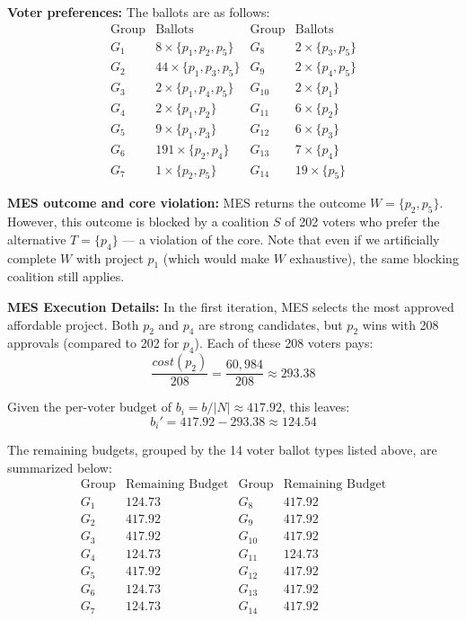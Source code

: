\documentclass[magisterska,en]{pracamgr}
\begin{document}
\textbf{Voter preferences:}
The ballots are as follows:
$$
\begin{array}{cl|cl}
    \text{Group} & \text{Ballots} & \text{Group} & \text{Ballots} \\
    \hline
    G_1 & 8\times\{p_1, p_2, p_5\} & G_8 & 2\times\{p_3, p_5\} \\
    G_2 & 44\times\{p_1, p_3, p_5\} & G_9 & 2\times\{p_4, p_5\} \\
    G_3 & 2\times\{p_1, p_4, p_5\} & G_{10} & 2\times\{p_1\} \\
    G_4 & 2\times\{p_1, p_2\} & G_{11} & 6\times\{p_2\} \\
    G_5 & 9\times\{p_1, p_3\} & G_{12} & 6\times\{p_3\} \\
    G_6 & 191\times\{p_2, p_4\} & G_{13} & 7\times\{p_4\} \\
    G_7 & 1\times\{p_2, p_5\} & G_{14} & 19\times\{p_5\}
\end{array}
$$

\textbf{MES outcome and core violation:}  
MES returns the outcome $W=\{p_2,p_5\}$. However, this outcome is blocked by a coalition $S$ of 202 voters who prefer the alternative $T=\{p_4\}$ --- a violation of the core. Note that even if we artificially complete $W$ with project $p_1$ (which would make $W$ exhaustive), the same blocking coalition still applies.

\textbf{MES Execution Details:}  
In the first iteration, MES selects the most approved affordable project. Both $p_2$ and $p_4$ are strong candidates, but $p_2$ wins with 208 approvals (compared to 202 for $p_4$). Each of these 208 voters pays:
$$
\frac{cost(p_2)}{208}=\frac{60{,}984}{208}\approx293.38
$$

Given the per-voter budget of $b_i=b/|N|\approx417.92$, this leaves:
$$
b_i'=417.92-293.38\approx124.54
$$

The remaining budgets, grouped by the 14 voter ballot types listed above, are summarized below:
$$
\begin{array}{cc|cc}
    \text{Group} & \text{Remaining Budget} & \text{Group} & \text{Remaining Budget} \\
    \hline
    G_1 & 124.73 & G_8 & 417.92 \\
    G_2 & 417.92 & G_9 & 417.92 \\
    G_3 & 417.92 & G_{10} & 417.92 \\
    G_4 & 124.73 & G_{11} & 124.73 \\
    G_5 & 417.92 & G_{12} & 417.92 \\
    G_6 & 124.73 & G_{13} & 417.92 \\
    G_7 & 124.73 & G_{14} & 417.92
\end{array}
$$
\end{document}
